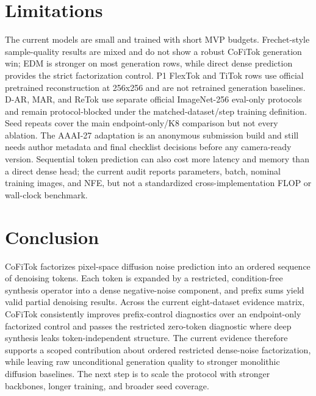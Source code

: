 \documentclass[letterpaper]{article}
\newcommand{\method}{CoFiTok}
\begin{document}
\section{Limitations}

The current models are small and trained with short MVP budgets. Frechet-style
sample-quality results are mixed and do not show a robust \method{} generation
win; EDM is stronger on most generation rows, while direct dense prediction
provides the strict factorization control. P1 FlexTok and
TiTok rows use official pretrained reconstruction at 256x256 and are not
retrained generation baselines. D-AR, MAR, and ReTok use separate official
ImageNet-256 eval-only protocols and remain protocol-blocked under the
matched-dataset/step training definition. Seed repeats cover the main
endpoint-only/K8 comparison but not every ablation. The AAAI-27 adaptation is an
anonymous submission build and still needs author metadata and final checklist
decisions before any camera-ready version. Sequential token prediction can also
cost more latency and memory than a direct dense head; the current audit reports
parameters, batch, nominal training images, and NFE, but not a standardized
cross-implementation FLOP or wall-clock benchmark.

\section{Conclusion}

\method{} factorizes pixel-space diffusion noise prediction into an ordered
  sequence of denoising tokens. Each token is expanded by a restricted,
condition-free synthesis operator into a dense negative-noise component, and
prefix sums yield valid partial denoising results. Across the current
eight-dataset evidence matrix, \method{} consistently improves prefix-control
diagnostics over an endpoint-only factorized control and passes the restricted zero-token
diagnostic where deep synthesis leaks token-independent structure. The current
evidence therefore supports a scoped contribution about ordered restricted
dense-noise factorization, while leaving raw unconditional generation quality
to stronger monolithic diffusion baselines. The next step is to scale the
protocol with stronger backbones, longer training, and broader seed coverage.


\end{document}
